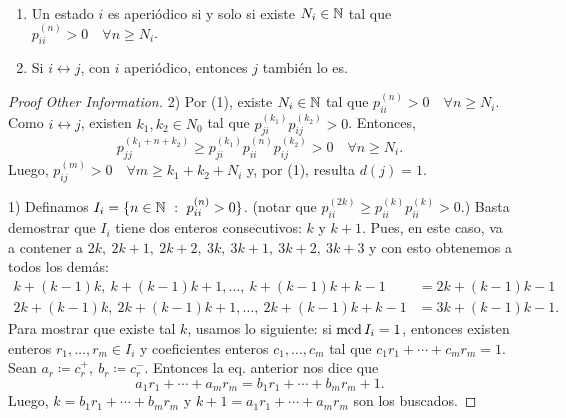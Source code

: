 \begin{prop}~
	\begin{enumerate}
		\item Un estado $i$ es aperiódico si y solo si existe $N_{i} \in \mathbb{N}$ tal que $p_{ii}^{(n)} > 0 \quad \forall n \geq N_{i}$.

		\item Si $i \leftrightarrow j$, con $i$ aperiódico, entonces $j$ también lo es.
	\end{enumerate}
\end{prop}
\begin{proof}[Proof Other Information]
	2) Por (1), existe $N_{i} \in \mathbb{N}$ tal que $p_{ii}^{(n)} > 0 \quad \forall n \geq N_{i}$. Como $i \leftrightarrow j$, existen $k_{1},k_{2} \in N_{0}$ tal que $p_{ji}^{(k_{1})} p_{ij}^{(k_{2})} > 0$. Entonces, 
	\[ p_{jj}^{(k_{1} + n + k_{2})} \geq p_{ji}^{(k_{1})} p_{ii}^{(n)} p_{ij}^{(k_{2})} > 0 \quad \forall n \geq N_{i}. \]
	Luego, $p_{ij}^{(m)} > 0 \quad \forall m \geq k_{1} + k_{2} + N_{i}$ y, por (1), resulta $d(j) = 1$. \par
	1) Definamos $I_{i} = \{n \in \N \ : \ p_{ii}^{(n)} > 0\}$. (notar que $p_{ii}^{(2k)} \geq p_{ii}^{(k)} p_{ii}^{(k)} > 0$.) Basta demostrar que $I_{i}$ tiene dos enteros consecutivos: $k$ y $k+1$. Pues, en este caso, va a contener a $2k,\ 2k+1,\ 2k+2,\ 3k,\ 3k+1,\ 3k+2,\ 3k+3$ y con esto obtenemos a todos los demás:
	\begin{align*}
		k + (k-1)k,\ k + (k-1)k + 1,\dots,\ k + (k-1)k + k - 1 &= 2k + (k-1)k - 1 \\
		2k + (k-1)k,\ 2k + (k-1)k + 1,\dots,\ 2k + (k-1)k + k - 1 &= 3k + (k-1)k - 1
	.\end{align*}
	Para mostrar que existe tal $k$, usamos lo siguiente: si $\operatorname{mcd} I_{i} = 1$, entonces existen enteros $r_{1},\dots,r_{m} \in I_{i}$ y coeficientes enteros $c_{1},\dots,c_{m}$ tal que $c_{1}r_{1} + \cdots + c_{m}r_{m} = 1$. Sean $a_{r} \coloneq c_{r}^{+},\ b_{r} \coloneq c_{r}^{-}$. Entonces la eq. anterior nos dice que
	\[ a_{1}r_{1} + \cdots + a_{m}r_{m} = b_{1}r_{1} + \cdots + b_{m} r_{m} + 1. \]
	Luego, $k = b_{1}r_{1} + \cdots + b_{m}r_{m}$ y $k+1 = a_{1}r_{1} + \cdots + a_{m}r_{m}$ son los buscados.
\end{proof}
